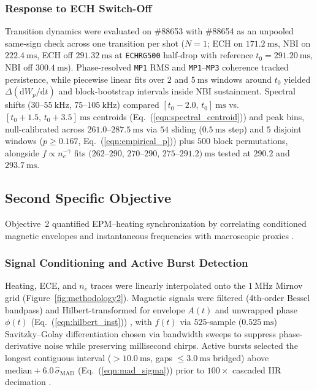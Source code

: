 \subsubsection{Response to ECH Switch-Off}
\label{subsubsec:method_ech_off}
Transition dynamics were evaluated on \#88653 with \#88654 as an unpooled same-sign check across one transition per shot ($N=1$; ECH on $171.2~\mathrm{ms}$, NBI on $222.4~\mathrm{ms}$, ECH off $291.32~\mathrm{ms}$ at \texttt{ECHRG500} half-drop with reference $t_0 = 291.20~\mathrm{ms}$, NBI off $300.4~\mathrm{ms}$). Phase-resolved \texttt{MP1} RMS and \texttt{MP1}--\texttt{MP3} coherence tracked persistence, while piecewise linear fits over $2$ and $5~\mathrm{ms}$ windows around $t_0$ yielded $\Delta(\mathrm{d}W_p/\mathrm{d}t)$ and block-bootstrap intervals inside NBI sustainment. Spectral shifts ($30\text{--}55~\mathrm{kHz}$, $75\text{--}105~\mathrm{kHz}$) compared $[t_0-2.0,\,t_0]~\mathrm{ms}$ vs.\ $[t_0+1.5,\,t_0+3.5]~\mathrm{ms}$ centroids (Eq.~(\ref{eqn:spectral_centroid})) and peak bins, null-calibrated across $261.0\text{--}287.5~\mathrm{ms}$ via $54$ sliding ($0.5~\mathrm{ms}$ step) and $5$ disjoint windows ($p \ge 0.167$, Eq.~(\ref{eqn:empirical_p})) plus $500$ block permutations, alongside $f \propto n_e^{-\gamma}$ fits $(262\text{--}290$, $270\text{--}290$, $275\text{--}291.2)~\mathrm{ms}$ tested at $290.2$ and $293.7~\mathrm{ms}$.

\subsection{Second Specific Objective}
Objective~2 quantified EPM--heating synchronization by correlating conditioned magnetic envelopes and instantaneous frequencies with macroscopic proxies \cite{Adulsiriswad_2024, Varela2023, Zhong2024}.

\subsubsection{Signal Conditioning and Active Burst Detection}
Heating, ECE, and $n_e$ traces were linearly interpolated onto the $1~\mathrm{MHz}$ Mirnov grid (Figure~\ref{fig:methodology2}). Magnetic signals were filtered (4th-order Bessel bandpass) and Hilbert-transformed for envelope $A(t)$ and unwrapped phase $\phi(t)$ (Eq.~(\ref{eqn:hilbert_inst})) \cite{zang2019observation, Fabus2021}, with $f(t)$ via $525$-sample ($0.525~\mathrm{ms}$) Savitzky--Golay differentiation chosen via bandwidth sweeps to suppress phase-derivative noise while preserving millisecond chirps. Active bursts selected the longest contiguous interval ($> 10.0~\mathrm{ms}$, gaps $\le 3.0~\mathrm{ms}$ bridged) above $\mathrm{median} + 6.0\,\hat{\sigma}_{\mathrm{MAD}}$ (Eq.~(\ref{eqn:mad_sigma})) prior to $100\times$ cascaded IIR decimation \cite{boashash2015time, Fabus2021}.

